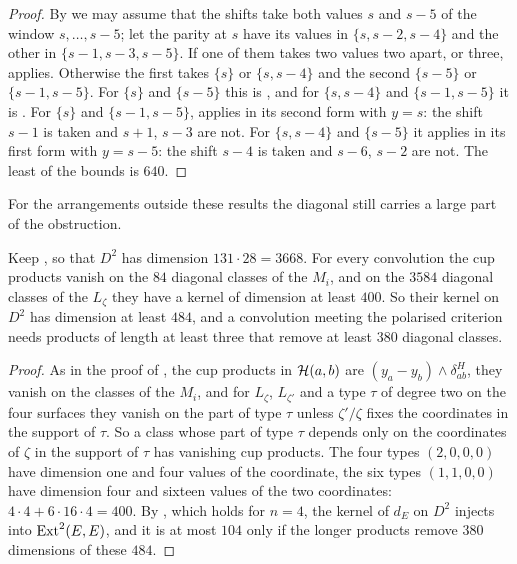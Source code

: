 \begin{proof}
By  we may assume that the shifts take both values $s$
and $s-5$ of the window $s,\dots,s-5$; let the parity at $s$ have its values
in $\{s,s-2,s-4\}$ and the other in $\{s-1,s-3,s-5\}$. If one of them takes
two values two apart, or three,  applies.
Otherwise the first takes $\{s\}$ or $\{s,s-4\}$ and the second $\{s-5\}$ or
$\{s-1,s-5\}$. For $\{s\}$ and $\{s-5\}$ this is ,
and for $\{s,s-4\}$ and $\{s-1,s-5\}$ it is . For
$\{s\}$ and $\{s-1,s-5\}$,  applies in its second form
with $y=s$: the shift $s-1$ is taken and $s+1$, $s-3$ are not. For
$\{s,s-4\}$ and $\{s-5\}$ it applies in its first form with $y=s-5$: the
shift $s-4$ is taken and $s-6$, $s-2$ are not. The least of the bounds is
$640$.
\end{proof}

For the arrangements outside these results the diagonal still carries a
large part of the obstruction.

\begin{proposition}[Cup products on the diagonal at $n=4$]
\label{prop:efourcupkernel}
Keep , so that $D^{2}$ has dimension $131\cdot28=3668$.
For every convolution the cup products vanish on the $84$ diagonal classes of
the $M_{i}$, and on the $3584$ diagonal classes of the $L_{\zeta}$ they have
a kernel of dimension at least $400$. So their kernel on $D^{2}$ has
dimension at least $484$, and a convolution meeting the polarised criterion
needs products of length at least three that remove at least $380$ diagonal
classes.
\end{proposition}

\begin{proof}
As in the proof of , the cup products in $\mathcal{H}(a,b)$
are $(y_{a}-y_{b})\wedge\delta^{H}_{ab}$, they vanish on the classes of the
$M_{i}$, and for $L_{\zeta}$, $L_{\zeta'}$ and a type $\tau$ of degree two on
the four surfaces they vanish on the part of type $\tau$ unless $\zeta'/\zeta$
fixes the coordinates in the support of $\tau$. So a class whose part of type
$\tau$ depends only on the coordinates of $\zeta$ in the support of $\tau$
has vanishing cup products. The four types $(2,0,0,0)$ have dimension one and
four values of the coordinate, the six types $(1,1,0,0)$ have dimension four
and sixteen values of the two coordinates: $4\cdot4+6\cdot16\cdot4=400$. By
, which holds for $n=4$, the kernel of $d_{E}$ on
$D^{2}$ injects into $\operatorname{Ext}^{2}(E,E)$, and it is at most $104$ only if the
longer products remove $380$ dimensions of these $484$.
\end{proof}

